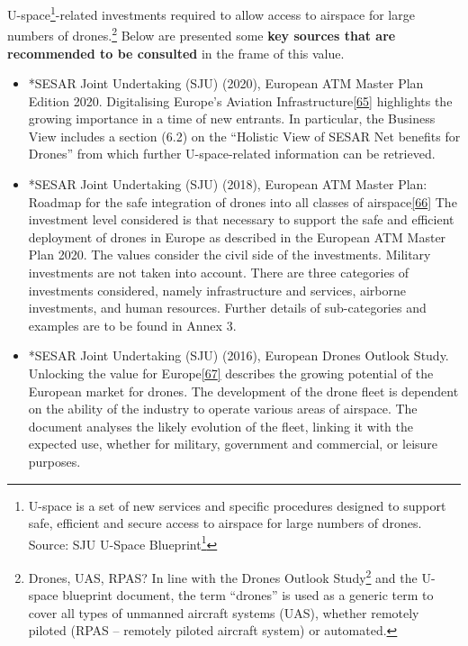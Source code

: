 \documentclass[
  11pt,
  a4paper,
]{book}
\DeclareRobustCommand{\href}[2]{#2\footnote{\url{#1}}}
\begin{document}
U-space\footnote{U-space is a set of new services and specific
  procedures designed to support safe, efficient and secure access to
  airspace for large numbers of drones. Source:
  \href{https://www.sesarju.eu/sites/default/files/documents/reports/U-space\%20Blueprint\%20brochure\%20final.PDF}{SJU
  U-Space Blueprint}}-related investments required to allow access to
airspace for large numbers of drones.\footnote{Drones, UAS, RPAS? In
  line with the \href{https://www.sesarju.eu/node/2951}{Drones Outlook
  Study} and the U-space blueprint document, the term ``drones'' is used
  as a generic term to cover all types of unmanned aircraft systems
  (UAS), whether remotely piloted (RPAS -- remotely piloted aircraft
  system) or automated.} Below are presented some \textbf{key sources
that are recommended to be consulted} in the frame of this value.

\begin{itemize}
\item
  *SESAR Joint Undertaking (SJU) (2020), European ATM Master Plan
  Edition 2020. Digitalising Europe's Aviation
  Infrastructure\protect\hyperlink{ref-ectrl:mp}{{[}65{]}} highlights
  the growing importance in a time of new entrants. In particular, the
  Business View includes a section (6.2) on the ``Holistic View of SESAR
  Net benefits for Drones'' from which further U-space-related
  information can be retrieved.
\item
  *SESAR Joint Undertaking (SJU) (2018), European ATM Master Plan:
  Roadmap for the safe integration of drones into all classes of
  airspace\protect\hyperlink{ref-sju:drones:2018}{{[}66{]}} The
  investment level considered is that necessary to support the safe and
  efficient deployment of drones in Europe as described in the European
  ATM Master Plan 2020. The values consider the civil side of the
  investments. Military investments are not taken into account. There
  are three categories of investments considered, namely infrastructure
  and services, airborne investments, and human resources. Further
  details of sub-categories and examples are to be found in Annex 3.
\item
  *SESAR Joint Undertaking (SJU) (2016), European Drones Outlook Study.
  Unlocking the value for
  Europe\protect\hyperlink{ref-sju:drones2016}{{[}67{]}} describes the
  growing potential of the European market for drones. The development
  of the drone fleet is dependent on the ability of the industry to
  operate various areas of airspace. The document analyses the likely
  evolution of the fleet, linking it with the expected use, whether for
  military, government and commercial, or leisure purposes.
\end{itemize}
\end{document}
